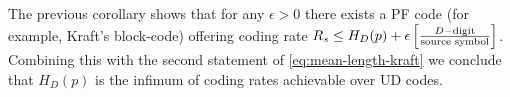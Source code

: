 \documentclass{../cs-classes/cs-classes}
\begin{document}
\begin{remark}
    The previous corollary shows that for any $\epsilon>0$ there exists a PF code (for example, Kraft's block-code) offering coding rate $R_s\leq H_D(p)+\epsilon \left[\frac{D-\textnormal{digit}}{\textnormal{source symbol}}\right]$. Combining this with the second statement of \eqref{eq:mean-length-kraft} we conclude that $H_D(p)$ is the infimum of coding rates achievable over UD codes.
\end{remark}
\end{document}
